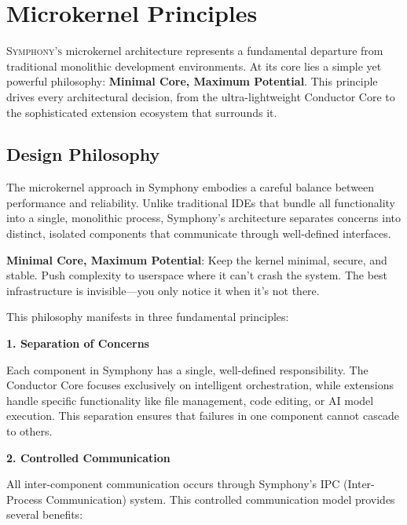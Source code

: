 
\section{Microkernel Principles}
\label{sec:microkernel-principles}

\lettrine{S}{ymphony's} microkernel architecture represents a fundamental departure from traditional monolithic development environments. At its core lies a simple yet powerful philosophy: \textbf{Minimal Core, Maximum Potential}. This principle drives every architectural decision, from the ultra-lightweight Conductor Core to the sophisticated extension ecosystem that surrounds it.

\subsection{Design Philosophy}
\label{subsec:design-philosophy}

The microkernel approach in Symphony embodies a careful balance between performance and reliability. Unlike traditional IDEs that bundle all functionality into a single, monolithic process, Symphony's architecture separates concerns into distinct, isolated components that communicate through well-defined interfaces.

\begin{infobox}[title=Core Philosophy]
\textbf{Minimal Core, Maximum Potential}: Keep the kernel minimal, secure, and stable. Push complexity to userspace where it can't crash the system. The best infrastructure is invisible—you only notice it when it's not there.
\end{infobox}

This philosophy manifests in three fundamental principles:

\textbf{1. Separation of Concerns}

Each component in Symphony has a single, well-defined responsibility. The Conductor Core focuses exclusively on intelligent orchestration, while extensions handle specific functionality like file management, code editing, or AI model execution. This separation ensures that failures in one component cannot cascade to others.

\textbf{2. Controlled Communication}

All inter-component communication occurs through Symphony's IPC (Inter-Process Communication) system. This controlled communication model provides several benefits:

